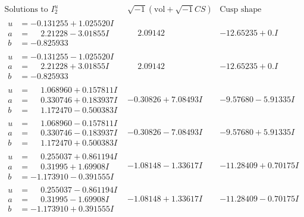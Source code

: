 \documentclass[1p]{elsarticle_modified}
\theoremstyle{definition}
\newcommand{\I}{\sqrt{-1}}
\begin{document}
$$\begin{array}{c|c|c}  
\text{Solutions to }I^u_{2}& \I (\text{vol} + \sqrt{-1}CS) & \text{Cusp shape}\\
 \hline 
\begin{aligned}
u &= -0.131255 + 1.025520 I \\
a &= \phantom{-}2.21228 - 3.01855 I \\
b &= -0.825933\phantom{ +0.000000I}\end{aligned}
 & \phantom{-}2.09142\phantom{ +0.000000I} & -12.65235 + 0. I\phantom{ +0.000000I} \\ \hline\begin{aligned}
u &= -0.131255 - 1.025520 I \\
a &= \phantom{-}2.21228 + 3.01855 I \\
b &= -0.825933\phantom{ +0.000000I}\end{aligned}
 & \phantom{-}2.09142\phantom{ +0.000000I} & -12.65235 + 0. I\phantom{ +0.000000I} \\ \hline\begin{aligned}
u &= \phantom{-}1.068960 + 0.157811 I \\
a &= \phantom{-}0.330746 + 0.183937 I \\
b &= \phantom{-}1.172470 - 0.500383 I\end{aligned}
 & -0.30826 + 7.08493 I & -9.57680 - 5.91335 I \\ \hline\begin{aligned}
u &= \phantom{-}1.068960 - 0.157811 I \\
a &= \phantom{-}0.330746 - 0.183937 I \\
b &= \phantom{-}1.172470 + 0.500383 I\end{aligned}
 & -0.30826 - 7.08493 I & -9.57680 + 5.91335 I \\ \hline\begin{aligned}
u &= \phantom{-}0.255037 + 0.861194 I \\
a &= \phantom{-}0.31995 + 1.69908 I \\
b &= -1.173910 - 0.391555 I\end{aligned}
 & -1.08148 - 1.33617 I & -11.28409 + 0.70175 I \\ \hline\begin{aligned}
u &= \phantom{-}0.255037 - 0.861194 I \\
a &= \phantom{-}0.31995 - 1.69908 I \\
b &= -1.173910 + 0.391555 I\end{aligned}
 & -1.08148 + 1.33617 I & -11.28409 - 0.70175 I \\ \hline\begin{aligned}

\end{aligned}
\end{array}$$
\end{document}
